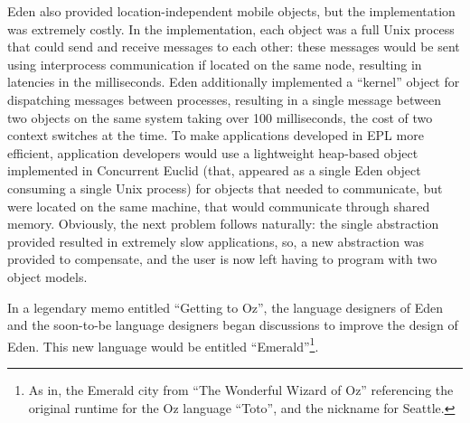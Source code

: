 Eden also provided location-independent mobile objects, but the implementation was extremely costly.  In the implementation, each object was a full Unix process that could send and receive messages to each other: these messages would be sent using interprocess communication if located on the same node, resulting in latencies in the milliseconds.  Eden additionally implemented a ``kernel'' object for dispatching messages between processes, resulting in a single message between two objects on the same system taking over 100 milliseconds, the cost of two context switches at the time.  To make applications developed in EPL more efficient, application developers would use a lightweight heap-based object implemented in Concurrent Euclid (that, appeared as a single Eden object consuming a single Unix process) for objects that needed to communicate, but were located on the same machine, that would communicate through shared memory.  Obviously, the next problem follows naturally: the single abstraction provided resulted in extremely slow applications, so, a new abstraction was provided to compensate, and the user is now left having to program with two object models.

In a legendary memo entitled ``Getting to Oz'', the language designers of Eden and the soon-to-be language designers began discussions to improve the design of Eden.  This new language would be entitled ``Emerald''\footnote{As in, the Emerald city from ``The Wonderful Wizard of Oz'' referencing the original runtime for the Oz language ``Toto'', and the nickname for Seattle.}.

